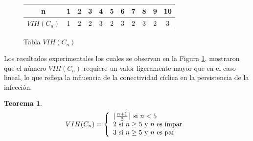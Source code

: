 \documentclass[12pt,titlepage,twoside,openright]{book}
\newtheorem{theorem}{Teorema}[section]
\begin{document}
\begin{figure}[h!]
    \centering
    \begin{tabular}{|c|cccccccccc|}
        \hline
        \textbf{n} & \textbf{1} & \textbf{2} & \textbf{3} & \textbf{4} & \textbf{5} & \textbf{6} & \textbf{7} & \textbf{8} & \textbf{9} & \textbf{10}\\
        \hline
        \textbf{$VIH(C_n)$} & 1 & 2 & 2 & 3 & 2 & 3 & 2 & 3 & 2 & 3 \\
        \hline
    \end{tabular}
    \caption{Tabla $VIH(C_n)$}
    \label{tabla:VIH(C_n)}
\end{figure}
Los resultados experimentales los cuales se observan en la Figura \ref{tabla:VIH(C_n)}, mostraron que el n\'umero $VIH(C_n)$ requiere un valor ligeramente mayor que en el caso lineal, lo que refleja la influencia de la conectividad c\'iclica en la persistencia de la infecci\'on.
\begin{theorem}\label{Teo:VIH(Cn)}
    $$
    VIH(C_n) = \left\lbrace
    \begin{array}{ll}
        \lceil\frac{n+1}{2} \rceil \textup{ si } n < 5\\
        2 \textup{ si } n\geq5 \textup{ y } n \textup{ es impar }\\
        3 \textup{ si } n\geq5 \textup{ y } n \textup{ es par }
    \end{array}
    \right.
    $$
\end{theorem}
\end{document}
